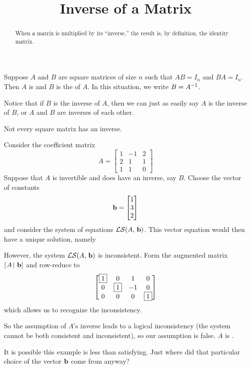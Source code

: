 \documentclass{ximera}
\title{Inverse of a Matrix}
\begin{document}
\begin{abstract}
  When a matrix is multiplied by its ``inverse,'' the result is, by
  definition, the identity matrix.
\end{abstract}
\maketitle

\begin{definition}
  Suppose $A$ and $B$ are square matrices of size $n$ such that
  $AB=I_n$ and $BA=I_n$.  Then $A$ is  and $B$ is the
   of $A$.  In this situation, we write $B=A^{-1}$.
\end{definition}

Notice that if $B$ is the inverse of $A$, then we can just as easily
say $A$ is the inverse of $B$, or $A$ and $B$ are inverses of each
other.

Not every square matrix has an inverse.  

\begin{example}

Consider the coefficient matrix 
\[
  A = \begin{bmatrix}
    1 & -1 & 2\\
    2 & 1 & 1\\
    1 & 1 & 0
  \end{bmatrix}
\]
Suppose that $A$ is invertible and does have an inverse, say $B$.
Choose the vector of constants
\[
\mathbf{b}=\begin{bmatrix}1\\3\\2\end{bmatrix}
\]
and consider the system of equations $\mathcal{LS}\!\left(A,\,\mathbf{b}\right)$.
This vector equation would then have a unique solution, namely
\begin{multipleChoice}
\end{multipleChoice}
However, the system $\mathcal{LS}\!\left(A,\,\mathbf{b}\right)$ is inconsistent.
Form the augmented matrix $\left\lbrack\left.A\,\right\rvert\,\mathbf{b}\right\rbrack$ and row-reduce to
\[
\begin{bmatrix}
\fbox{1} & 0 & 1 & 0\\
0 & \fbox{1} & -1 & 0\\
0 & 0 & 0 & \fbox{1}
\end{bmatrix}
\]
which allows us to recognize the inconsistency.

So the assumption of $A$'s inverse leads to a logical inconsistency
(the system cannot be both consistent and inconsistent), so our
assumption is false.  $A$ is .

It is possible this example is less than satisfying.  Just where did
that particular choice of the vector $\mathbf{b}$ come from anyway?
\end{example}
\end{document}

